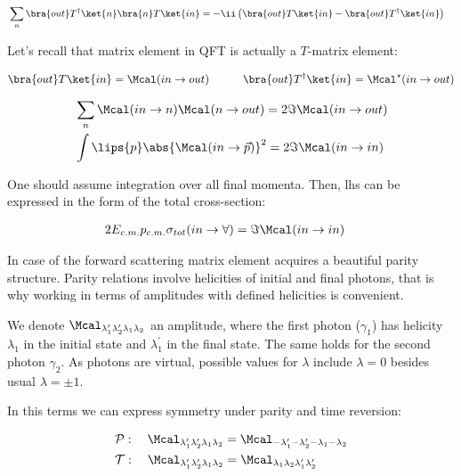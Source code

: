 \begin{align}
    & \sum_{n} \bra{out} T^\dag \ket{n}\bra{n} T \ket{in} = -\ii \left( \bra{out} T \ket{in} - \bra{out} T^\dag \ket{in} \right)
\end{align}

Let's recall that matrix element in QFT is actually a $T$-matrix element:

\begin{align}
    & \bra{out} T \ket{in} = \Mcal(in \rightarrow out) \qquad &\bra{out} T^\dag \ket{in} = \Mcal^\star(in \rightarrow out)
\end{align}

\begin{align}
        & \sum_{n} \Mcal(in \rightarrow n)  \Mcal(n \rightarrow out) = 2 \Im \Mcal(in \rightarrow out) \\
        & \int \lips{p} \abs{\Mcal(in \rightarrow \vec{p})}^2 = 2 \Im \Mcal(in \rightarrow in)
\end{align}

One should assume integration over all final momenta. Then, lhs can be expressed in the form of the total cross-section:

\begin{align}
    & 2 E_{c.m.} p_{c.m.} \sigma_{tot}(in \rightarrow \forall) =  \Im \Mcal(in \rightarrow in) \label{eq:optical-th}
\end{align}

In case of the forward scattering matrix element acquires a beautiful parity structure. Parity relations involve helicities of initial and final photons, that is why working in terms of amplitudes with defined helicities is convenient.

We denote $\Mcal_{\lambda^\prime_1 \lambda^\prime_2 \lambda_1 \lambda_2}$ an amplitude, where the first photon ($\gamma_1$) has helicity $\lambda_1$ in the initial state and $\lambda_1^\prime$ in the final state. The same holds for the second photon $\gamma_2$. As photons are virtual, possible values for $\lambda$ include $\lambda=0$ besides usual $\lambda=\pm1$.

In this terms we can express symmetry under parity and time reversion:

\begin{align}
    & \mathcal{P}:\quad \Mcal_{\lambda_1^\prime \lambda_2^\prime \lambda_1 \lambda_2} = \Mcal_{-\lambda_1^\prime -\lambda_2^\prime -\lambda_1 -\lambda_2} \\
    & \mathcal{T}:\quad \Mcal_{\lambda_1^\prime \lambda_2^\prime \lambda_1 \lambda_2} = \Mcal_{\lambda_1 \lambda_2 \lambda_1^\prime \lambda_2^\prime}
\end{align}

